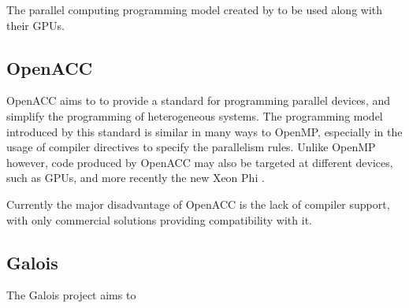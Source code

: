 \documentclass[main.tex]{subfiles}
\begin{document}
The parallel computing programming model created by \nvidia to be used along with their \acsp{GPU}. 

\subsection{\acs{OpenACC}}

\acs{OpenACC} aims to to provide a standard for programming parallel devices, and simplify the programming of heterogeneous systems.
The programming model introduced by this standard is similar in many ways to \acs{OpenMP}, especially in the usage of compiler directives to specify the parallelism rules. Unlike \acs{OpenMP} however, code produced by \acs{OpenACC} may also be targeted at different devices, such as \acsp{GPU}, and more recently the new \intel Xeon Phi \cite{openacc-phi2012}.

Currently the major disadvantage of \acs{OpenACC} is the lack of compiler support, with only commercial solutions providing compatibility with it.


\subsection{Galois}

The Galois project aims to
\end{document}
